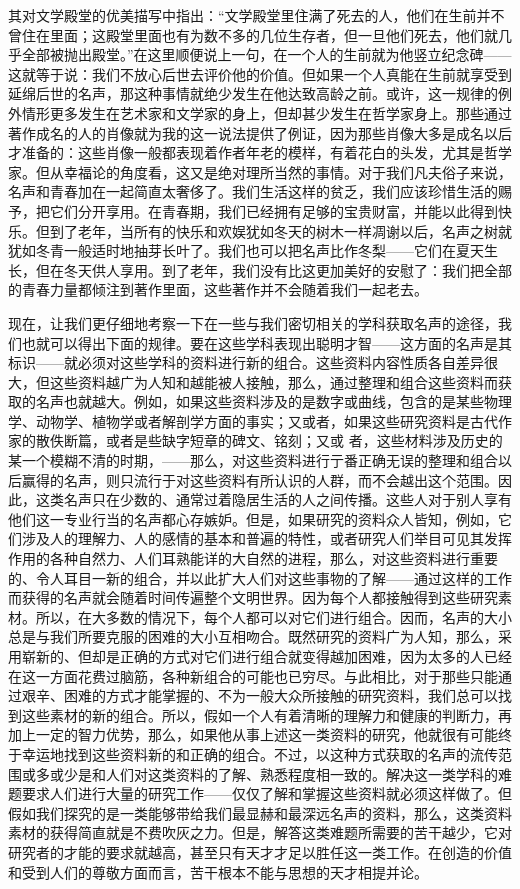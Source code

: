 \documentclass[12pt,oneside]{book}
\begin{document}
其对文学殿堂的优美描写中指出：“文学殿堂里住满了死去的人，他们在生前并不曾住在里面；这殿堂里面也有为数不多的几位生存者，但一旦他们死去，他们就几乎全部被抛出殿堂。”在这里顺便说上一句，在一个人的生前就为他竖立纪念碑——这就等于说：我们不放心后世去评价他的价值。但如果一个人真能在生前就享受到延绵后世的名声，那这种事情就绝少发生在他达致高龄之前。或许，这一规律的例外情形更多发生在艺术家和文学家的身上，但却甚少发生在哲学家身上。那些通过著作成名的人的肖像就为我的这一说法提供了例证，因为那些肖像大多是成名以后才准备的：这些肖像一般都表现着作者年老的模样，有着花白的头发，尤其是哲学家。但从幸福论的角度看，这又是绝对理所当然的事情。对于我们凡夫俗子来说，名声和青春加在一起简直太奢侈了。我们生活这样的贫乏，我们应该珍惜生活的赐予，把它们分开享用。在青春期，我们已经拥有足够的宝贵财富，并能以此得到快乐。但到了老年，当所有的快乐和欢娱犹如冬天的树木一样凋谢以后，名声之树就犹如冬青一般适时地抽芽长叶了。我们也可以把名声比作冬梨——它们在夏天生长，但在冬天供人享用。到了老年，我们没有比这更加美好的安慰了：我们把全部的青春力量都倾注到著作里面，这些著作并不会随着我们一起老去。 

现在，让我们更仔细地考察一下在一些与我们密切相关的学科获取名声的途径，我们也就可以得出下面的规律。要在这些学科表现出聪明才智——这方面的名声是其标识——就必须对这些学科的资料进行新的组合。这些资料内容性质各自差异很大，但这些资料越广为人知和越能被人接触，那么，通过整理和组合这些资料而获取的名声也就越大。例如，如果这些资料涉及的是数字或曲线，包含的是某些物理学、动物学、植物学或者解剖学方面的事实；又或者，如果这些研究资料是古代作家的散佚断篇，或者是些缺字短章的碑文、铭刻；又或
者，这些材料涉及历史的某一个模糊不清的时期，——那么，对这些资料进行亍番正确无误的整理和组合以后赢得的名声，则只流行于对这些资料有所认识的人群，而不会越出这个范围。因此，这类名声只在少数的、通常过着隐居生活的人之间传播。这些人对于别人享有他们这一专业行当的名声都心存嫉妒。但是，如果研究的资料众人皆知，例如，它们涉及人的理解力、人的感情的基本和普遍的特性，或者研究人们举目可见其发挥作用的各种自然力、人们耳熟能详的大自然的进程，那么，对这些资料进行重要的、令人耳目一新的组合，并以此扩大人们对这些事物的了解——通过这样的工作而获得的名声就会随着时间传遍整个文明世界。因为每个人都接触得到这些研究素材。所以，在大多数的情况下，每个人都可以对它们进行组合。因而，名声的大小总是与我们所要克服的困难的大小互相吻合。既然研究的资料广为人知，那么，采用崭新的、但却是正确的方式对它们进行组合就变得越加困难，因为太多的人已经在这一方面花费过脑筋，各种新组合的可能也已穷尽。与此相比，对于那些只能通过艰辛、困难的方式才能掌握的、不为一般大众所接触的研究资料，我们总可以找到这些素材的新的组合。所以，假如一个人有着清晰的理解力和健康的判断力，再加上一定的智力优势，那么，如果他从事上述这一类资料的研究，他就很有可能终于幸运地找到这些资料新的和正确的组合。不过，以这种方式获取的名声的流传范围或多或少是和人们对这类资料的了解、熟悉程度相一致的。解决这一类学科的难题要求人们进行大量的研究工作——仅仅了解和掌握这些资料就必须这样做了。但假如我们探究的是一类能够带给我们最显赫和最深远名声的资料，那么，这类资料素材的获得简直就是不费吹灰之力。但是，解答这类难题所需要的苦干越少，它对研究者的才能的要求就越高，甚至只有天才才足以胜任这一类工作。在创造的价值和受到人们的尊敬方面而言，苦干根本不能与思想的天才相提并论。 
\end{document}

